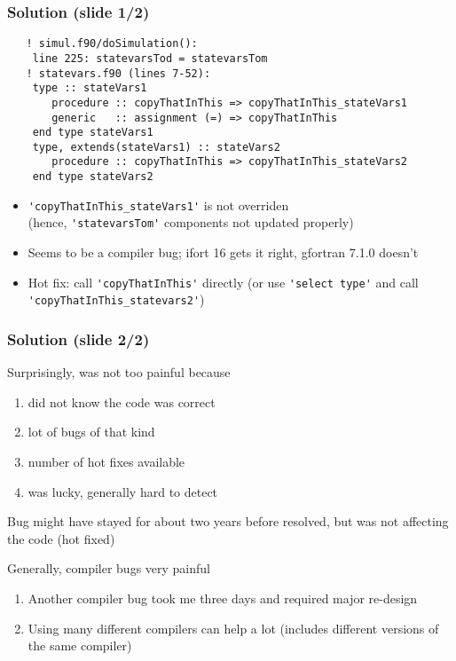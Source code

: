 


\begin{frame}[fragile]
\frametitle{Solution (slide 1/2)}

\begin{lstlisting}
   ! simul.f90/doSimulation():
    line 225: statevarsTod = statevarsTom
   ! statevars.f90 (lines 7-52):
    type :: stateVars1
       procedure :: copyThatInThis => copyThatInThis_stateVars1
       generic   :: assignment (=) => copyThatInThis
    end type stateVars1
    type, extends(stateVars1) :: stateVars2
       procedure :: copyThatInThis => copyThatInThis_stateVars2
    end type stateVars2
\end{lstlisting}

\begin{itemize}
   \item{\verb|'copyThatInThis_stateVars1'| is not overriden \\ (hence, \verb|'statevarsTom'| components not updated properly)}
   \item{Seems to be a compiler bug; ifort 16 gets it right, gfortran 7.1.0 doesn't}
   \item{Hot fix: call \verb|'copyThatInThis'| directly (or use \verb|'select type'| and call \verb|'copyThatInThis_statevars2'|)}
\end{itemize}


\end{frame}


\begin{frame}[fragile]
\frametitle{Solution (slide 2/2)}

\begin{itemize}
   \item{Surprisingly, was not too painful because
      \begin{enumerate}
         \item{did not know the code was correct \smiley{}}
         \item{lot of bugs of that kind}
         \item{number of hot fixes available}
         \item{was lucky, generally hard to detect}
      \end{enumerate}
      }
   \item{Bug might have stayed for about two years before resolved, but was not affecting the code (hot fixed)
   \item{Generally, compiler bugs very painful}
      \begin{enumerate}
          \item{Another compiler bug took me three days and required major re-design}
          \item{Using many different compilers can help a lot (includes different versions of the same compiler)}
      \end{enumerate}
	   }
\end{itemize}



\end{frame}


